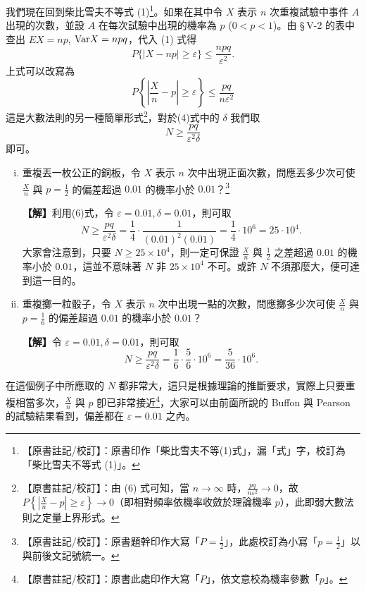 我們現在回到柴比雪夫不等式 (1)\label{note:b5-ch5-p166-ineq1}\footnote{【原書註記/校訂】：原書印作「柴比雪夫不等(1)式」，漏「式」字，校訂為「柴比雪夫不等式 (1)」。}。如果在其中令 $X$ 表示 $n$ 次重複試驗中事件 $A$ 出現的次數，並設 $A$ 在每次試驗中出現的機率為 $p$ ($0 < p < 1$)。由 \S\,V-2 的表中查出 $EX = np$, $\text{Var} X = npq$，代入 (1) 式得
\[
P\{|X - np| \ge \varepsilon\} \le \frac{npq}{\varepsilon^2}.
\]
上式可以改寫為
\begin{equation}
P\left\{\left|\frac{X}{n} - p\right| \ge \varepsilon\right\} \le \frac{pq}{n\varepsilon^2} \tag{6}\label{eq:b5-5-3-6}
\end{equation}
這是大數法則的另一種簡單形式\label{note:b5-ch5-p166-wlln}\footnote{【原書註記/校訂】：由 (6) 式可知，當 $n \to \infty$ 時，$\frac{pq}{n\varepsilon^2} \longrightarrow 0$，故 $P\left\{\left|\frac{X}{n} - p\right| \ge \varepsilon\right\} \longrightarrow 0$（即相對頻率依機率收斂於理論機率 $p$），此即弱大數法則之定量上界形式。}，對於(4)式中的 $\delta$ 我們取
\[
N \ge \frac{pq}{\varepsilon^2 \delta}
\]
即可。

\medskip
\begin{example}\label{ex:b5-5-18}
\begin{enumerate}[(i), leftmargin=2.5em, itemsep=0.5em]
  \item 重複丟一枚公正的銅板，令 $X$ 表示 $n$ 次中出現正面次數，問應丟多少次可使 $\frac{X}{n}$ 與 $p = \frac{1}{2}$ 的偏差超過 $0.01$ 的機率小於 $0.01$？\label{note:b5-ch5-p166-p}\footnote{【原書註記/校訂】：原書題幹印作大寫「$P = \frac{1}{2}$」，此處校訂為小寫「$p = \frac{1}{2}$」以與前後文記號統一。}
  \par\smallskip\noindent\textbf{【解】}\quad 利用(6)式，令 $\varepsilon = 0.01, \delta = 0.01$，則可取
  \[
  N \ge \frac{pq}{\varepsilon^2 \delta} = \frac{1}{4} \cdot \frac{1}{(0.01)^2 (0.01)} = \frac{1}{4} \cdot 10^6 = 25 \cdot 10^4.
  \]
  大家會注意到，只要 $N \ge 25 \times 10^4$，則一定可保證 $\frac{X}{n}$ 與 $\frac{1}{2}$ 之差超過 $0.01$ 的機率小於 $0.01$，這並不意味著 $N$ 非 $25 \times 10^4$ 不可。或許 $N$ 不須那麼大，便可達到這一目的。

  \item 重複擲一粒骰子，令 $X$ 表示 $n$ 次中出現一點的次數，問應擲多少次可使 $\frac{X}{n}$ 與 $p = \frac{1}{6}$ 的偏差超過 $0.01$ 的機率小於 $0.01$？
  \par\smallskip\noindent\textbf{【解】}\quad 令 $\varepsilon = 0.01, \delta = 0.01$，則可取
  \[
  N \ge \frac{pq}{\varepsilon^2 \delta} = \frac{1}{6} \cdot \frac{5}{6} \cdot 10^6 = \frac{5}{36} \cdot 10^6.
  \]
\end{enumerate}
\end{example}

在這個例子中所應取的 $N$ 都非常大，這只是根據理論的推斷要求，實際上只要重複相當多次，$\frac{X}{n}$ 與 $p$ 卽已非常接近\label{note:b5-ch5-p167-p}\footnote{【原書註記/校訂】：原書此處印作大寫「$P$」，依文意校為機率參數「$p$」。}，大家可以由前面所說的 Buffon 與 Pearson 的試驗結果看到，偏差都在 $\varepsilon = 0.01$ 之內。
